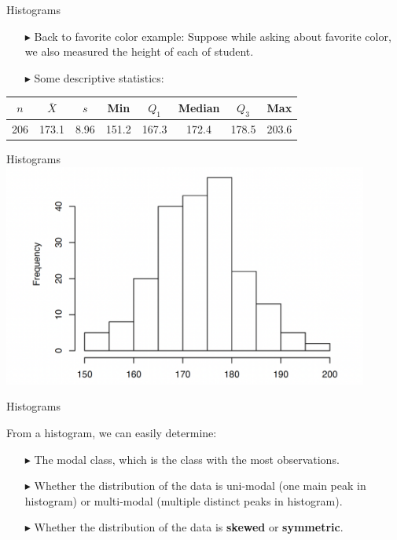 \documentclass[12pt]{beamer}
\begin{document}
\begin{frame}{Histograms}
	
	\begin{itemize}
		\item[$\blacktriangleright$] Back to favorite color example: Suppose while asking about favorite color, we also measured the height of each of student.
		\item[$\blacktriangleright$] Some descriptive statistics:
	\end{itemize}
		\begin{center}
		\begin{tabular}{cccccccc}
			\hline
			$n$ & $\bar{X}$ &$s$&Min &$Q_1$&Median&$Q_3$&Max\\
			\hline
			206 & 173.1 &8.96& 151.2& 167.3&172.4&178.5&203.6\\
			\hline
		\end{tabular}
	\end{center}
\end{frame}
\begin{frame}{Histograms}
\centering
\includegraphics[width=12cm]{histo1.png}
\end{frame}
\begin{frame}{Histograms}
	
From a histogram, we can easily determine:
	\begin{itemize}
	\item[$\blacktriangleright$] The modal class, which is the class with the most observations.
	\item[$\blacktriangleright$] Whether the distribution of the data is uni-modal (one main peak in histogram) or multi-modal (multiple distinct peaks in histogram).
	\item[$\blacktriangleright$] Whether the distribution of the data is {\bf skewed} or {\bf symmetric}.
\end{itemize}
\end{frame}
\end{document}
